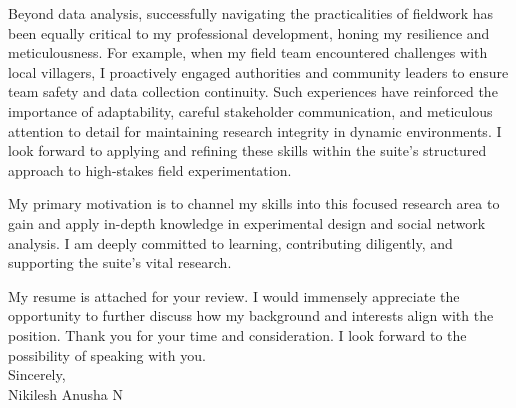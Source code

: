 \documentclass[a4paper]{scrartcl}
\begin{document}
Beyond data analysis, successfully navigating the practicalities of fieldwork has been equally critical to my professional development, honing my resilience and meticulousness. 
For example, when my field team encountered challenges with local villagers, I proactively engaged authorities and community leaders to ensure team safety and data collection continuity. 
Such experiences have reinforced the importance of adaptability, careful stakeholder communication, and meticulous attention to detail for maintaining research integrity in dynamic environments. 
I look forward to applying and refining these skills within the suite’s structured approach to high-stakes field experimentation.

My primary motivation is to channel my skills into this focused research area to gain and apply in-depth knowledge in experimental design and social network analysis. I am deeply committed to learning, contributing diligently, and supporting the suite's vital research.

My resume is attached for your review. I would immensely appreciate the opportunity to further discuss how my background and interests align with the position. Thank you for your time and consideration. I look forward to the possibility of speaking with you.
\vspace{1.5em}
\\
Sincerely, \\
Nikilesh Anusha N
\end{document}
